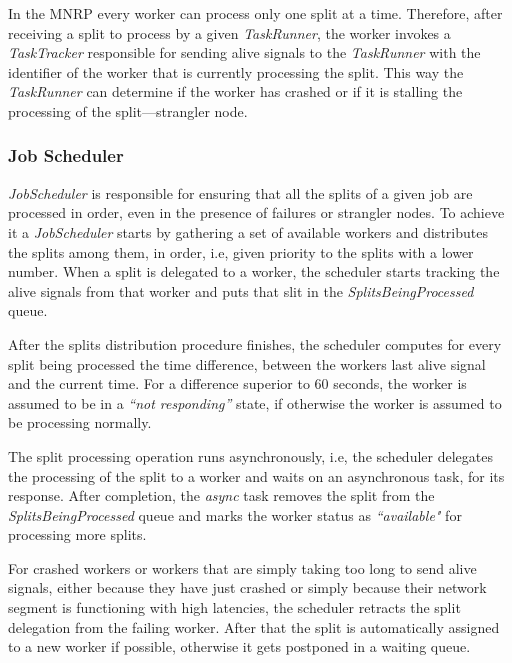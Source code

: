 \documentclass[times, 10pt,twocolumn]{article}
\begin{document}
           In the \ac{MNRP} every worker can process only one split at a time. Therefore, after receiving a split to process by a given \textit{TaskRunner}, the worker invokes a \textit{TaskTracker} responsible for sending alive signals to the \textit{TaskRunner} with the identifier of the worker that is currently processing the split. This way the \textit{TaskRunner} can determine if the worker has crashed or if it is stalling the processing of the split—strangler node.

        	\subsubsection{Job Scheduler}\label{job-scheduler}
            
            \textit{JobScheduler} is responsible for ensuring that all the splits of a given job are processed in order, even in the presence of failures or strangler nodes. To achieve it a \textit{JobScheduler} starts by gathering a set of available workers and distributes the splits among them, in order, i.e, given priority to the splits with a lower number. When a split is delegated to a worker, the scheduler starts tracking the alive signals from that worker and puts that slit in the \textit{SplitsBeingProcessed} queue.
            
            After the splits distribution procedure finishes, the scheduler computes for every split being processed the time difference, between the workers last alive signal and the current time. For a difference superior to 60 seconds, the worker is assumed to be in a \textit{``not responding''} state, if otherwise the worker is assumed to be processing normally.
            
            The split processing operation runs asynchronously, i.e, the scheduler delegates the processing of the split to a worker and waits on an asynchronous task, for its response. After completion, the \textit{async} task removes the split from the \textit{SplitsBeingProcessed} queue and marks the worker status as \textit{``available"} for processing more splits.
            
            For crashed workers or workers that are simply taking too long to send alive signals, either because they have just crashed or simply because their network segment is functioning with high latencies, the scheduler retracts the split delegation from the failing worker. After that the split is automatically assigned to a new worker if possible, otherwise it gets postponed in a waiting queue.
            
\end{document}

